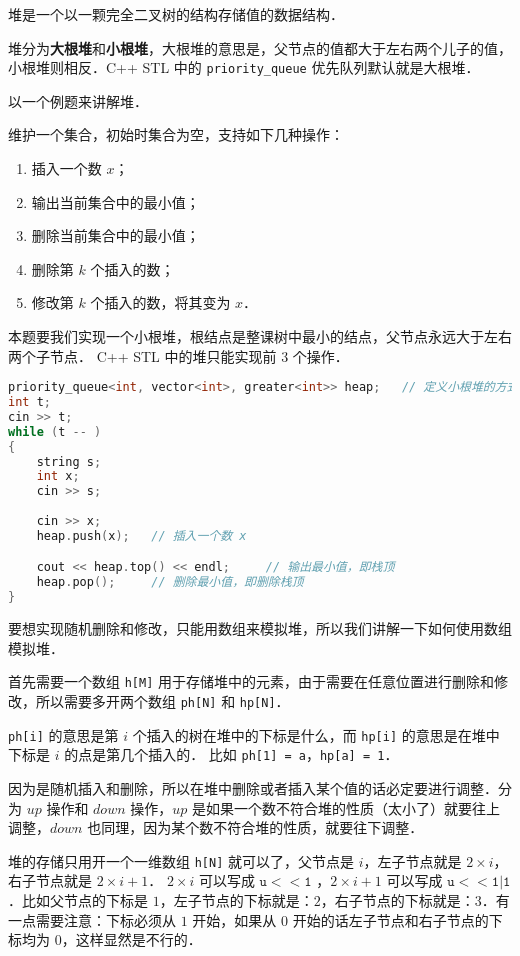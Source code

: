 
堆是一个以一颗完全二叉树的结构存储值的数据结构．

堆分为\textbf{大根堆}和\textbf{小根堆}，大根堆的意思是，父节点的值都大于左右两个儿子的值，小根堆则相反．C++ STL 中的 \verb|priority_queue| 优先队列默认就是大根堆．

以一个例题来讲解堆．

维护一个集合，初始时集合为空，支持如下几种操作：
\begin{enumerate}
\item 插入一个数 $x$；
\item 输出当前集合中的最小值；
\item 删除当前集合中的最小值；
\item 删除第 $k$ 个插入的数；
\item 修改第 $k$ 个插入的数，将其变为 $x$．
\end{enumerate}

本题要我们实现一个小根堆，根结点是整课树中最小的结点，父节点永远大于左右两个子节点．
C++ STL 中的堆只能实现前 $3$ 个操作．
\begin{lstlisting}[language=cpp]
priority_queue<int, vector<int>, greater<int>> heap;   // 定义小根堆的方式
int t;
cin >> t;
while (t -- )
{
    string s;
    int x;
    cin >> s;
            
    cin >> x;
    heap.push(x);   // 插入一个数 x

    cout << heap.top() << endl;     // 输出最小值，即栈顶
    heap.pop();     // 删除最小值，即删除栈顶
}
\end{lstlisting}

要想实现随机删除和修改，只能用数组来模拟堆，所以我们讲解一下如何使用数组模拟堆．

首先需要一个数组 \verb|h[M]| 用于存储堆中的元素，由于需要在任意位置进行删除和修改，所以需要多开两个数组 \verb|ph[N]| 和 \verb|hp[N]|．

\verb|ph[i]| 的意思是第 $i$ 个插入的树在堆中的下标是什么，而 \verb|hp[i]| 的意思是在堆中下标是 $i$ 的点是第几个插入的．
比如 \verb|ph[1] = a|，\verb|hp[a] = 1|．

因为是随机插入和删除，所以在堆中删除或者插入某个值的话必定要进行调整．分为 $up$ 操作和 $down$ 操作，$up$ 是如果一个数不符合堆的性质（太小了）就要往上调整，$down$ 也同理，因为某个数不符合堆的性质，就要往下调整．

堆的存储只用开一个一维数组 \verb|h[N]| 就可以了，父节点是 $i$，左子节点就是 $2 \times i$，右子节点就是 $2 \times i + 1$．
$2 \times i$ 可以写成 $\mathtt{u << 1}$ ，$2 \times i + 1$ 可以写成 $\mathtt{u << 1 | 1}$．比如父节点的下标是 $1$，左子节点的下标就是：$2$，右子节点的下标就是：$3$．有一点需要注意：下标必须从 $1$ 开始，如果从 $0$ 开始的话左子节点和右子节点的下标均为 $0$，这样显然是不行的．


